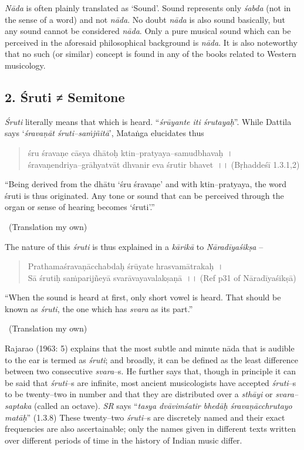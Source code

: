 \textit{Nāda} is often plainly translated as ‘Sound’. Sound represents only \textit{śabda} (not in the sense of a word) and not \textit{nāda}. No doubt \textit{nāda} is also sound basically, but any sound cannot be considered \textit{nāda}. Only a pure musical sound which can be perceived in the aforesaid philosophical background is \textit{nāda}. It is also noteworthy that no such (or similar) concept is found in any of the books related to Western musicology.


\subsection*{2. Śruti ≠ Semitone}

\textit{Śruti} literally means that which is heard. “\textit{śrūyante iti śrutayaḥ}”. While Dattila says ‘\textit{śravaṇāt śruti–saṁjñitā}’, Mataṅga elucidates thus

\begin{verse}
śru śravaṇe cāsya dhātoḥ ktin–pratyaya–samudbhavaḥ~।\\ śravaṇendriya–grāhyatvāt dhvanir eva śrutir bhavet~।। (Bṛhaddeśī 1.3.1,2)
\end{verse}

\begin{myquote}
“Being derived from the dhātu ‘śru śravaṇe’ and with ktin–pratyaya, the word śruti is thus originated. Any tone or sound that can be perceived through the organ or sense of hearing becomes ‘śruti’.” 

~\hfill (Translation my own)
\end{myquote}

The nature of this \textit{śruti} is thus explained in a \textit{kārikā} to \textit{Nāradīyaśikṣa} –

\begin{verse}
Prathamaśravaṇācchabdaḥ śrūyate hrasvamātrakaḥ~।\\ Sā śrutiḥ saṁparijñeyā svarāvayavalakṣaṇā~।। (Ref p31 of Nāradīyaśikṣā)
\end{verse}

\begin{myquote}
“When the sound is heard at first, only short vowel is heard. That should be known as \textit{śruti}, the one which has \textit{svara} as its part.” 

~\hfill (Translation my own)
\end{myquote}

Rajarao (1963: 5) explains that the most subtle and minute nāda that is audible to the ear is termed as \textit{śruti}; and broadly, it can be defined as the least difference between two consecutive \textit{svara}–s. He further says that, though in principle it can be said that \textit{śruti}–s are infinite, most ancient musicologists have accepted \textit{śruti}–s to be twenty–two in number and that they are distributed over a \textit{sthāyi} or \textit{svara–saptaka} (called an octave). \textit{SR} says “\textit{tasya dvāvimśatir bhedāḥ śravaṇācchrutayo matāḥ}” (1.3.8) These twenty–two \textit{śruti}–s are discretely named and their exact frequencies are also ascertainable; only the names given in different texts written over different periods of time in the history of Indian music differ.

